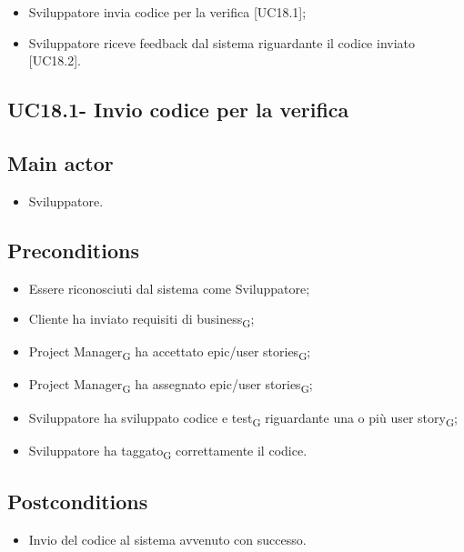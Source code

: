 \documentclass{article}
\begin{document}
        \begin{itemize}
            \item Sviluppatore invia codice per la verifica [UC18.1];

            \item Sviluppatore riceve feedback dal sistema riguardante il codice inviato [UC18.2].
        \end{itemize}
        
    \subsection{UC18.1- Invio codice per la verifica}
    \subsection*{Main actor}
        \begin{itemize}
            \item Sviluppatore.
        \end{itemize}
        
    \subsection*{Preconditions}
        \begin{itemize}
            \item Essere riconosciuti dal sistema come Sviluppatore;
            \item Cliente ha inviato requisiti di business\textsubscript{G};
            \item Project Manager\textsubscript{G} ha accettato epic/user stories\textsubscript{G};
            \item Project Manager\textsubscript{G} ha assegnato epic/user stories\textsubscript{G};
            \item Sviluppatore ha sviluppato codice e test\textsubscript{G} riguardante una o più user story\textsubscript{G};
            \item Sviluppatore ha taggato\textsubscript{G} correttamente il codice.
        \end{itemize}

    \subsection*{Postconditions}
        \begin{itemize}
            \item Invio del codice al sistema avvenuto con successo.
        \end{itemize}
\end{document}
